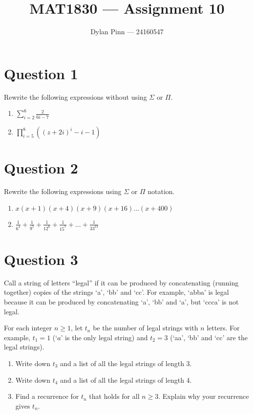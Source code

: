 \documentclass[11pt]{article}
\begin{document}
\title{MAT1830 --- Assignment 10}
\author{Dylan Pinn --- 24160547}
\maketitle

\section*{Question 1}
Rewrite the following expressions without using $\Sigma$ or $\Pi$.

\begin{enumerate}[label= (\alph*)]
  \item $\sum_{i=2}^{6} \frac{2}{6i - 7}$

  \item $\prod_{i=5}^{8} ({(z + 2i)}^{i} - i - 1)$

\end{enumerate}

\section*{Question 2}
Rewrite the following expressions using $\Sigma$ or $\Pi$ notation.

\begin{enumerate}[label= (\alph*)]
  \item $x(x+1)(x+4)(x+9)(x+16) \dots (x+400)$

  \item $\frac{1}{6^4} + \frac{1}{9^5} + \frac{1}{12^6} + \frac{1}{15^7} + \dots
    + \frac{1}{33^{13}}$

\end{enumerate}

\section*{Question 3}
Call a string of letters ``legal'' if it can be produced by concatenating
(running together) copies of the strings `a', `bb' and `cc'. For example,
`abba' is legal because it can be produced by concatenating `a', `bb' and `a',
but `ccca' is not legal.

For each integer $n \geq 1$, let $t_n$ be the number of legal strings with $n$
letters. For example, $t_1 = 1$ (`$a$' is the only legal string) and $t_2 = 3$
(`aa', `bb' and `cc' are the legal strings).

\begin{enumerate}[label= (\alph*)]
  \item Write down $t_3$ and a list of all the legal strings of length 3.

  \item Write down $t_4$ and a list of all the legal strings of length 4.

  \item Find a recurrence for $t_n$ that holds for all $n \geq 3$. Explain why
    your recurrence gives $t_n$.

\end{enumerate}
\end{document}
